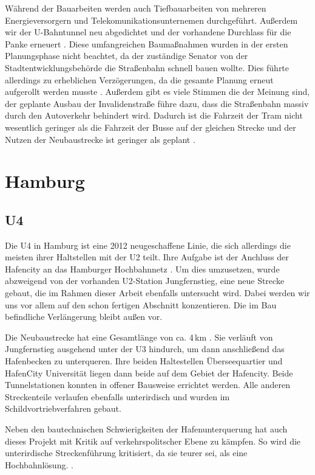 Während der Bauarbeiten werden auch Tiefbauarbeiten von mehreren
Energieversorgern und Telekomunikationsunternemen
durchgeführt. Außerdem wir der U-Bahntunnel neu abgedichtet und
der vorhandene Durchlass für die Panke
erneuert \cite{flyerInvalidestr}. Diese umfangreichen Baumaßnahmen
wurden in der ersten Planungsphase nicht beachtet, da der zuständige
Senator von der Stadtentwicklungsbehörde die Straßenbahn schnell bauen
wollte. Dies führte allerdings zu erheblichen Verzögerungen, da die
gesamte Planung erneut aufgerollt werden
musste \cite{bzSchnell}. Außerdem gibt es viele Stimmen die der Meinung
sind, der geplante Ausbau der Invalidenstraße führe dazu, dass die
Straßenbahn massiv durch den Autoverkehr behindert wird. Dadurch ist
die Fahrzeit der Tram nicht wesentlich geringer als die Fahrzeit der
Busse auf der gleichen Strecke und der Nutzen der Neubaustrecke ist
geringer als geplant \cite{protram}.

\section{Hamburg}
\subsection*{U4}

Die U4 in Hamburg ist eine 2012 neugeschaffene Linie, die sich allerdings die
meisten ihrer Haltstellen mit der U2 teilt. Ihre Aufgabe ist der Anchluss der
Hafencity an das Hamburger Hochbahnnetz \cite{keuHH}. Um dies umzusetzen, wurde
abzweigend von der vorhanden U2-Station Jungfernstieg, eine neue Strecke gebaut,
die im Rahmen dieser Arbeit ebenfalls untersucht wird. Dabei werden wir uns vor
allem auf den schon fertigen Abschnitt konzentieren. Die im Bau befindliche
Verlängerung bleibt außen vor.

Die Neubaustrecke hat eine Gesamtlänge von ca. 4\,km \cite{keuHH}. Sie verläuft
von Jungfernstieg ausgehend unter der U3 hindurch, um dann anschließend das
Hafenbecken zu unterqueren. Ihre beiden Haltestellen Überseequartier und
HafenCity Universität liegen dann beide auf dem Gebiet der Hafencity. Beide
Tunnelstationen konnten in offener Bausweise errichtet werden. Alle anderen
Streckenteile verlaufen ebenfalls unterirdisch und wurden im
Schildvortriebverfahren gebaut.

Neben den bautechnischen Schwierigkeiten der Hafenunterquerung hat auch dieses
Projekt mit Kritik auf verkehrspolitscher Ebene zu kämpfen. So wird die
unterirdische Streckenführung kritisiert, da sie teurer sei, als eine
Hochbahnlösung. \cite{hamburgerAbendblattu4}.

